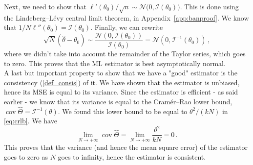 \documentclass[final]{aomart}
\newtheorem[{}\it]{thm}{Theorem}[section]
\theoremstyle{definition}
\newtheorem*[{}\it]{notation}{Notation}
\numberwithin{equation}{section}
\newcommand{\wh}{\widehat}
\newcommand{\htheta}{\hat{\theta}} %
\newcommand{\hTheta}{\wh{\Theta}} %
\newcommand{\fisher}{\mathcal{I}} %
\DeclareMathOperator{\cov}{cov}
\begin{document}
Next, we need to show that \(\ell'(\theta_0)/\sqrt{n} \sim \mathcal{N}\big(0, \fisher(\theta_0)\big)\).
This is done using the Lindeberg--Lévy central limit theorem, in Appendix~\ref{app:banproof}.
We know that \(1/N \ell''(\theta_0) = \fisher(\theta_0)\).
Finally, we can rewrite
\begin{equation}
\sqrt{N} (\htheta - \theta_0) \sim \frac{\mathcal{N}(0, \fisher(\theta_0))}{\fisher(\theta_0)} = \mathcal{N}(0, \fisher^{-1}(\theta_0))\,,
\end{equation}
where we didn't take into account the remainder of the Taylor series, which goes to zero.
This proves that the ML estimator is best asymptotically normal. \\

A last but important property to show that we have a "good" estimator is the consistency (\ref{def_consis}) of it. We have shown that the estimator is unbiased, hence its MSE is equal to its variance.
Since the estimator is efficient - as said earlier - we know that its variance is equal to the Cramér--Rao lower bound, \(\cov \hTheta = \fisher^{-1}(\theta)\).
We found this lower bound to be equal to \(\theta^2/(kN)\) in \eqref{eq:crlb}.
We have
\begin{equation}
\lim_{N \to +\infty} \cov \hTheta = \lim_{N \to +\infty} \frac{\theta^2}{kN} = 0\,.
\end{equation}
This proves that the variance (and hence the mean square error) of the estimator goes to zero as \(N\) goes to infinity, hence the estimator is consistent.
\end{document}
